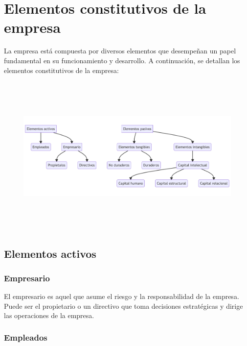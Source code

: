 \documentclass[
  letterpaper,
  DIV=11,
  numbers=noendperiod]{scrartcl}
\begin{document}
\hypertarget{elementos-constitutivos-de-la-empresa}{%
\section{Elementos constitutivos de la
empresa}\label{elementos-constitutivos-de-la-empresa}}

La empresa está compuesta por diversos elementos que desempeñan un papel
fundamental en su funcionamiento y desarrollo. A continuación, se
detallan los elementos constitutivos de la empresa:

\begin{figure}[H]

{\centering \includegraphics[width=9.98in,height=3.15in]{index_files/figure-latex/mermaid-figure-1.png}

}

\end{figure}

\hypertarget{elementos-activos}{%
\subsection{Elementos activos}\label{elementos-activos}}

\hypertarget{empresario}{%
\subsubsection{Empresario}\label{empresario}}

El empresario es aquel que asume el riesgo y la responsabilidad de la
empresa. Puede ser el propietario o un directivo que toma decisiones
estratégicas y dirige las operaciones de la empresa.

\hypertarget{empleados}{%
\subsubsection{Empleados}\label{empleados}}
\end{document}
